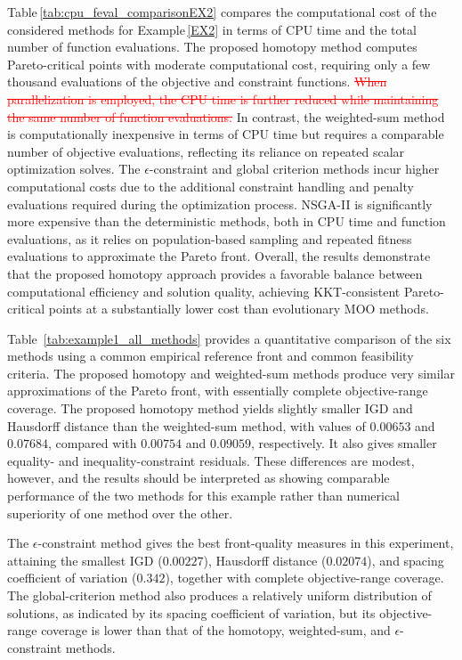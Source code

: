 \documentclass[11pt,pdflatex,sn-mathphys-ay]{sn-jnl}%
\theoremstyle{definition}
\theoremstyle{thmstyleone}%
\theoremstyle{thmstyletwo}%
\theoremstyle{thmstylethree}%
\newcommand{\del}[1]{\textcolor{red}{\sout{#1}}}
\newcommand{\add}[1]{\textcolor{revisionblue}{#1}}
\begin{document}
	Table\,\ref{tab:cpu_feval_comparisonEX2} compares the computational cost of the considered methods for Example\,\ref{EX2} in terms of CPU time and the total number of function evaluations. The proposed homotopy method computes Pareto-critical points with moderate computational cost, requiring only a few thousand evaluations of the objective and constraint functions. \del{When parallelization is employed, the CPU time is further reduced while maintaining the same number of function evaluations.}
	In contrast, the weighted-sum method is computationally inexpensive in terms of CPU time but requires a comparable number of objective evaluations, reflecting its reliance on repeated scalar optimization solves. The $\epsilon$-constraint and global criterion methods incur higher computational costs due to the additional constraint handling and penalty evaluations required during the optimization process. NSGA-II is significantly more expensive than the deterministic methods, both in CPU time and function evaluations, as it relies on population-based sampling and repeated fitness evaluations to approximate the Pareto front.
	Overall, the results demonstrate that the proposed homotopy approach provides a favorable balance between computational efficiency and solution quality, achieving KKT-consistent Pareto-critical points at a substantially lower cost than evolutionary MOO methods.
	
	\add{Table~\ref{tab:example1_all_methods} provides a quantitative comparison
		of the six methods using a common empirical reference front and common
		feasibility criteria. The proposed homotopy and weighted-sum methods
		produce very similar approximations of the Pareto front, with essentially
		complete objective-range coverage. The proposed homotopy method yields
		slightly smaller IGD and Hausdorff distance than the weighted-sum method,
		with values of $0.00653$ and $0.07684$, compared with $0.00754$ and
		$0.09059$, respectively. It also gives smaller equality- and
		inequality-constraint residuals. These differences are modest, however,
		and the results should be interpreted as showing comparable performance
		of the two methods for this example rather than numerical superiority of
		one method over the other.}
	
	\add{The $\epsilon$-constraint method gives the best front-quality measures in
		this experiment, attaining the smallest IGD ($0.00227$), Hausdorff
		distance ($0.02074$), and spacing coefficient of variation ($0.342$),
		together with complete objective-range coverage. The global-criterion
		method also produces a relatively uniform distribution of solutions, as
		indicated by its spacing coefficient of variation, but its objective-range
		coverage is lower than that of the homotopy, weighted-sum, and
		$\epsilon$-constraint methods.}
	
\end{document}
